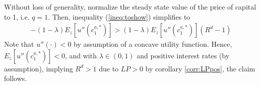 \documentclass[11pt]{article} %
\begin{document}
Without loss of generality, normalize the steady state value of the price of capital to 1, i.e. $q=1$. Then, inequality (\ref{ineq:toshow}) simplifies to
\begin{align}
    -(1-\lambda) E_z[u''(c^{a,*}_1)] > (1-\lambda) E_z[u''(c^{a,*}_1)](R^d-1)
\end{align}
Note that $u''(\cdot)<0$ by assumption of a concave utility function. Hence, $E_z[u''(c^{a,*}_1)]<0$, and with $\lambda \in (0,1)$ and positive interest rates (by assumption), implying $R^d>1$ due to $LP>0$ by corollary \ref{corr:LPpos}, the claim follows.
\end{document}
